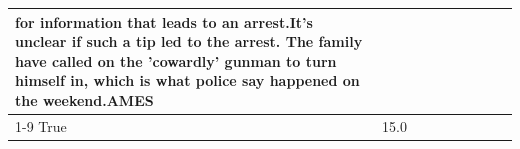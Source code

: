 \begin{table}[H]
\begin{tabular}{lllrlllll}
for information that leads to an arrest.It's unclear if such a tip led to the arrest. The family have called on the 'cowardly' gunman to turn himself in, which is what police say happened on the weekend.AMES \\
\cline{1-9}
True & 15.0%
\end{tabular}
\end{table}
